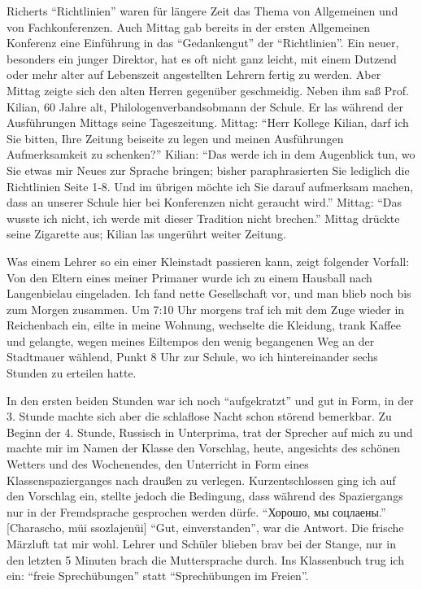 \documentclass[a5paper,pagesize,10pt,twoside=true]{scrbook}
\newcommand\textcyr[1]{{\fontencoding{OT2}\fontfamily{wncyr}\selectfont #1}}	%
\renewcommand{\marginpar}[2][]{}
\begin{document}
Richerts \enquote{Richtlinien} waren für längere Zeit das Thema von Allgemeinen und von Fachkonferenzen. Auch Mittag gab bereits in der ersten Allgemeinen Konferenz eine Einführung in das \enquote{Gedankengut} der \enquote{Richtlinien}. Ein neuer, besonders ein junger Direktor, hat es oft nicht ganz leicht, mit einem Dutzend oder mehr alter auf Lebenszeit angestellten Lehrern fertig zu werden. Aber Mittag zeigte sich den alten Herren gegenüber geschmeidig. Neben ihm saß Prof. Kilian, 60 Jahre alt, Philologenverbandsobmann der Schule. Er las während der Ausführungen Mittags seine Tageszeitung. Mittag: \enquote{Herr Kollege Kilian, darf ich Sie bitten, Ihre Zeitung beiseite zu legen und meinen Ausführungen Aufmerksamkeit zu schenken?} Kilian: \enquote{Das werde ich in dem Augenblick tun, wo Sie etwas mir Neues zur Sprache bringen; bisher paraphrasierten Sie lediglich die Richtlinien Seite 1-8. Und im übrigen möchte ich Sie darauf aufmerksam machen, dass an unserer Schule hier bei Konferenzen nicht geraucht wird.} Mittag: \enquote{Das wusste ich nicht, ich werde mit dieser Tradition nicht brechen.} Mittag drückte seine Zigarette aus; Kilian las ungerührt weiter Zeitung.

\marginpar{452}
Was einem Lehrer so ein einer Kleinstadt passieren kann, zeigt folgender Vorfall: Von den Eltern eines meiner Primaner wurde ich zu einem Hausball nach Langenbielau eingeladen. Ich fand nette Gesellschaft vor, und man blieb noch bis zum Morgen zusammen. Um 7:10 Uhr morgens traf ich mit dem Zuge wieder in Reichenbach ein, eilte in meine Wohnung, wechselte die Kleidung, trank Kaffee und gelangte, wegen meines Eiltempos den wenig begangenen Weg an der Stadtmauer wählend, Punkt 8 Uhr zur Schule, wo ich hintereinander sechs Stunden zu erteilen hatte.

In den ersten beiden Stunden war ich noch \enquote{aufgekratzt} und gut in Form, in der 3. Stunde machte sich aber die schlaflose Nacht schon störend bemerkbar. Zu Beginn der 4. Stunde, Russisch in Unterprima, trat der Sprecher auf mich zu und machte mir im Namen der Klasse den Vorschlag, heute, angesichts des schönen Wetters und des Wochenendes, den Unterricht in Form eines Klassenspazierganges nach draußen zu verlegen. Kurzentschlossen ging ich auf den Vorschlag ein, stellte jedoch die Bedingung, dass während des Spaziergangs nur in der Fremdsprache gesprochen werden dürfe. \enquote{\textcyr{Хорошо, мы соцлаены.}} [Charascho, müi ssozlajenüi] \enquote{Gut, einverstanden}, war die Antwort. Die frische Märzluft tat mir wohl. Lehrer und Schüler blieben brav bei der Stange, nur in den letzten 5 Minuten brach die Muttersprache durch. Ins Klassenbuch trug ich ein: \enquote{freie Sprechübungen} statt \enquote{Sprechübungen im Freien}.
\end{document}

